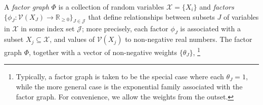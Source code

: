 \documentclass{article}
\theoremstyle{plain}
\theoremstyle{definition}
\theoremstyle{remark}
\newcommand{\V}{\mathcal V}
\numberwithin{equation}{section}
\begin{document}
\begin{defn}
  A \emph{factor graph} $\Phi$ is a collection of random variables
        $\mathcal X = \{X_i\}$ and \emph{factors}
       $\{\phi_J\colon \V(X_J) \to \mathbb R_{\geq0}\}_{J \in
    \mathcal J }$ %
  that define relationships between subsets $J$ of variables in
        $\mathcal X$ in some index set $\mathcal J$;
more precisely, each factor $\phi_J$ is associated with a subset
$X_j\subseteq \mathcal{X}$,
and values of $\V(X_j)$ to non-negative real numbers.
The factor graph $\Phi$,
together with a vector of non-negative weights $\{ \theta_J \}$,%
\footnote{
Typically, a factor graph is taken to be the special case
where each $\theta_J=1$,
 while the more general
case is the exponential family associated with the factor graph.
 For convenience, we allow the weights from the outset.}

\end{defn}
\end{document}
